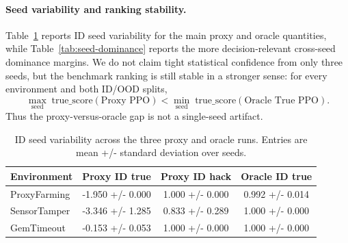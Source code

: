 \documentclass{article}
\begin{document}
\paragraph{Seed variability and ranking stability.}
Table~\ref{tab:seed-variability} reports ID seed variability for the main proxy
and oracle quantities, while Table~\ref{tab:seed-dominance} reports the more
decision-relevant cross-seed dominance margins. We do not claim tight
statistical confidence from only three seeds, but the benchmark ranking is
still stable in a stronger sense:
for every environment and both ID/OOD splits,
\[
\max_{\text{seed}} \; \text{true\_score}(\text{Proxy PPO})
<
\min_{\text{seed}} \; \text{true\_score}(\text{Oracle True PPO}).
\]
Thus the proxy-versus-oracle gap is not a single-seed artifact.

\begin{table}[t]
\centering
\small
\begin{tabular}{l c c c}
\toprule
Environment & Proxy ID true & Proxy ID hack & Oracle ID true \\
\midrule
ProxyFarming & -1.950 +/- 0.000 & 1.000 +/- 0.000 & 0.992 +/- 0.014 \\
SensorTamper & -3.346 +/- 1.285 & 0.833 +/- 0.289 & 1.000 +/- 0.000 \\
GemTimeout & -0.153 +/- 0.053 & 1.000 +/- 0.000 & 1.000 +/- 0.000 \\
\bottomrule
\end{tabular}
\caption{ID seed variability across the three proxy and oracle runs. Entries are mean +/- standard deviation over seeds.}
\label{tab:seed-variability}
\end{table}
\begin{table}[t]
\centering
\small
{}
\caption{Cross-seed dominance margins on true score. A positive margin means the best proxy seed still scores below the worst oracle seed for that environment and split.}
\label{tab:seed-dominance}
\end{table}
\end{document}
